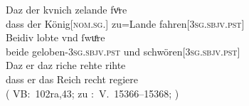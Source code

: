 \begin{exe}
\ex \label{ex:konjadjvvbeidiu}
	\begin{xlist}

	\ex \label{ex:konjadjvvbeidiu_2} %
		\gll Daz der kvnich zelande fvͦre \\
			dass der König[\textsc{nom.sg.\MascM}] zu=Lande
			fahren[\textsc{3sg\subM.sbjv.pst}] \\
	\sn \gll Beidiv lobte vnd ſwuͤre \\
			beide geloben-\textsc{3sg\subM.sbjv.pst} und
			schwören[\textsc{3sg\subM.sbjv.pst}] \\
	\sn \gll Daz er daz riche rehte rihte \\
			dass er das Reich recht regiere \\
		\trans {}
			(%
				VB:~102ra,43; zu
				\KC:~V.~15366--15368;
				\cite[359]{schroeder1895}%
			)



\end{xlist}
\end{exe}
